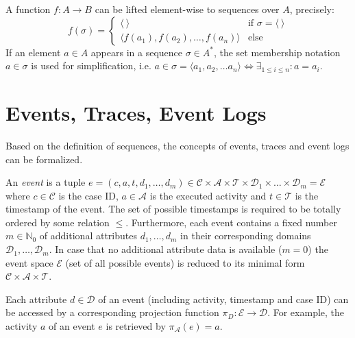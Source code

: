 A function $f \colon A \to B$ can be lifted element-wise to sequences over $A$, precisely:
\begin{equation*}
f(\sigma) =
\begin{cases}
\langle~\rangle & \text{if $\sigma = \langle~\rangle$} \\
\langle f(a_1), f(a_2), \dots, f(a_n)\rangle & \text{else} 
\end{cases}
\end{equation*}
If an element $a \in A$ appears in a sequence $\sigma \in A^*$, the set membership notation $a \in \sigma$ is used for simplification, i.e. $a \in \sigma = \langle a_1, a_2, \dots a_n \rangle \iff \exists_{1 \leq i \leq n} \colon a = a_i$.

\section{Events, Traces, Event Logs}

Based on the definition of sequences, the concepts of events, traces and event logs can be formalized.
\begin{definition}[Event]
An  \textit{event} is a tuple $e = (c,a,t,d_1,\dots, d_m) \in \mathcal{C} \times \mathcal{A}  \times \mathcal{T} \times \mathcal{D}_1 \times \dots \times \mathcal{D}_m =  \mathcal{E}$ where  $c \in \mathcal{C} $ is the case ID, $a \in \mathcal{A}$ is the executed activity and $t \in \mathcal{T}$ is the timestamp of the event.
The set of possible timestamps is required to be totally ordered by some relation $\leq$.
Furthermore, each event contains a fixed number $m \in \mathbb{N}_0$ of additional attributes $d_1, \dots, d_m$ in their corresponding domains $\mathcal{D}_1, \dots , \mathcal{D}_m$.
In case that no additional attribute data is available ($m = 0$) the event space $\mathcal{E}$ (set of all possible events) is reduced to its minimal form $\mathcal{C} \times \mathcal{A}  \times \mathcal{T}$.
\end{definition}
Each attribute $d \in \mathcal{D}$ of an event (including activity, timestamp and case ID) can be accessed by a corresponding projection function $\pi_D \colon \mathcal{E} \to \mathcal{D}$.
For example, the activity $a$ of an event $e$ is retrieved by $\pi_\mathcal{A}(e) = a$.


